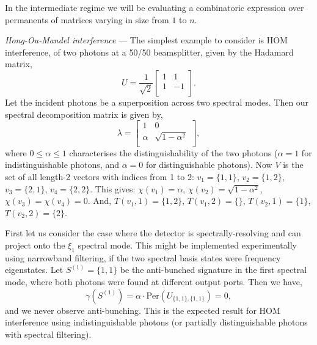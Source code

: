\documentclass[aps,prl,twocolumn,amsmath,amssymb,nofootinbib,superscriptaddress]{revtex4}
\begin{document}
In the intermediate regime we will be evaluating a combinatoric expression over permanents of matrices varying in size from $1$ to $n$.

%
%

\emph{Hong-Ou-Mandel interference} --- The simplest example to consider is HOM interference, of two photons at a 50/50 beamsplitter, given by the Hadamard matrix,
\begin{equation}
U = \frac{1}{\sqrt{2}} \left[ \begin{array}{cc}
1 & 1 \\
1 & -1 \\
\end{array} \right].
\end{equation}
Let the incident photons be a superposition across two spectral modes. Then our spectral decomposition matrix is given by,
\begin{equation}
\lambda = \left[ \begin{array}{cc}
1 & 0 \\
\alpha & \sqrt{1-\alpha^2} \\
\end{array} \right],
\end{equation}
where \mbox{$0\leq \alpha\leq 1$} characterises the distinguishability of the two photons (\mbox{$\alpha=1$} for indistinguishable photons, and \mbox{$\alpha=0$} for distinguishable photons). Now $V$ is the set of all length-2 vectors with indices from 1 to 2: \mbox{$v_1=\{1,1\}$}, \mbox{$v_2=\{1,2\}$}, \mbox{$v_3=\{2,1\}$}, \mbox{$v_4=\{2,2\}$}. This gives: \mbox{$\chi(v_1)=\alpha$}, \mbox{$\chi(v_2)=\sqrt{1-\alpha^2}$}, \mbox{$\chi(v_3)=\chi(v_4)=0$}. And, \mbox{$T(v_1,1)=\{1,2\}$}, \mbox{$T(v_1,2)=\{\}$}, \mbox{$T(v_2,1)=\{1\}$}, \mbox{$T(v_2,2)=\{2\}$}.

First let us consider the case where the detector is spectrally-resolving and can project onto the $\xi_1$ spectral mode. This might be implemented experimentally using narrowband filtering, if the two spectral basis states were frequency eigenstates. Let \mbox{$S^{(1)}=\{1,1\}$} be the anti-bunched signature in the first spectral mode, where both photons were found at different output ports. Then we have,
\begin{equation}
\gamma(S^{(1)}) = \alpha \cdot\mathrm{Per}\left(U_{\{1,1\},\{1,1\}}\right) = 0,
\end{equation}
and we never observe anti-bunching. This is the expected result for HOM interference using indistinguishable photons (or partially distinguishable photons with spectral filtering).
\end{document}
